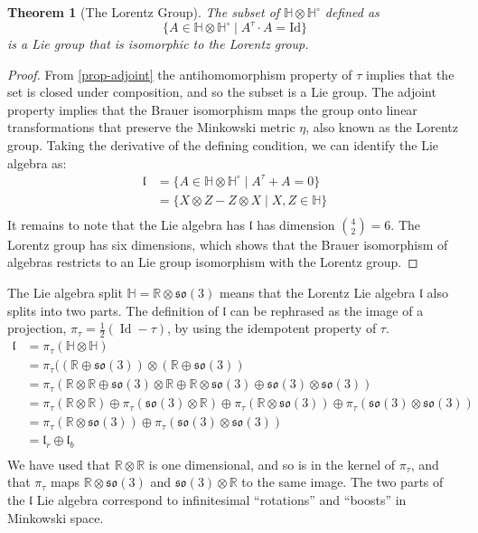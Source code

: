 \documentclass{amsart}
\newcommand{\HH}{\mathbb{H}}
\newcommand{\RR}{\mathbb{R}}
\newcommand{\so}{\mathfrak{so}}
\newcommand{\lorentz}{\mathfrak{l}}
\newcommand{\Id}{\operatorname{Id}}
\newtheorem{theorem}{Theorem}
\begin{document}
\begin{theorem}[The Lorentz Group]
  The subset of $ \HH\otimes \HH^\circ$ defined as
  $$ \{ A \in \HH\otimes\HH^\circ \mid A^\tau \cdot A = \mathrm{Id} \} $$
  is a Lie group that is isomorphic to the Lorentz group.
\end{theorem}

\begin{proof}
From \ref{prop-adjoint} the antihomomorphism property of $\tau$ implies that the set is closed under composition, and so the subset is a Lie group.
The adjoint property implies that the Brauer isomorphism maps the group onto linear transformations that preserve the Minkowski metric $\eta$, also known as the Lorentz group.
Taking the derivative of the defining condition, we can identify the Lie algebra as:
  \begin{align*}
    \lorentz &= \{ A \in \HH\otimes\HH^\circ \mid A^\tau + A = 0 \} \\
     &= \{ X \otimes Z - Z\otimes X \mid X, Z \in \HH \} \\
  \end{align*}
  It remains to note that the Lie algebra has $\lorentz$ has dimension ${4 \choose 2} = 6$.
  The Lorentz group has six dimensions, which shows that the Brauer isomorphism of algebras restricts to an Lie group isomorphism with the Lorentz group.

\end{proof}

The Lie algebra split $\HH=\RR\otimes\so(3)$ means that the Lorentz Lie algebra $\lorentz$ also splits into two parts.
The definition of $\lorentz$ can be rephrased as the image of a projection, $\pi_\tau = \frac{1}{2}(\Id - \tau )$, by using the idempotent property of $\tau$.
\begin{align*}
  \lorentz &= \pi_\tau(\HH\otimes\HH) \\
  &= \pi_\tau((\RR\oplus\so(3))\otimes(\RR\oplus\so(3)) \\
  &= \pi_\tau(\RR\otimes\RR \oplus \so(3)\otimes\RR \oplus \RR\otimes\so(3) \oplus \so(3)\otimes\so(3)) \\
  &= \pi_\tau(\RR\otimes\RR) \oplus \pi_\tau(\so(3)\otimes\RR) \oplus \pi_\tau(\RR\otimes\so(3)) \oplus \pi_\tau(\so(3)\otimes\so(3)) \\
  &= \pi_\tau(\RR\otimes\so(3)) \oplus \pi_\tau(\so(3)\otimes\so(3)) \\
  &= \lorentz_r \oplus \lorentz_b \\
\end{align*}
We have used that $\RR\otimes\RR$ is one dimensional, and so is in the kernel of $\pi_\tau$, and that $\pi_\tau$ maps $\RR\otimes\so(3)$ and $\so(3)\otimes\RR$ to the same image.
The two parts of the $\lorentz$ Lie algebra correspond to infinitesimal ``rotations'' and ``boosts'' in Minkowski space.
\end{document}
